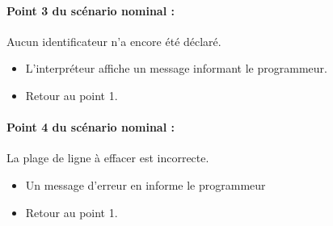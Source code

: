 \documentclass[12pt,a4paper]{article}
\begin{document}
            \paragraph{Point 3 du scénario nominal :} Aucun identificateur n'a encore été
            déclaré.
            \begin{itemize}
                \item L'interpréteur affiche un message informant le programmeur.
                \item Retour au point 1.
            \end{itemize}

            \paragraph{Point 4 du scénario nominal :} La plage de ligne à effacer est
            incorrecte.
            \begin{itemize}
                \item Un message d'erreur en informe le programmeur
                \item Retour au point 1.
            \end{itemize}


    
\end{document}
